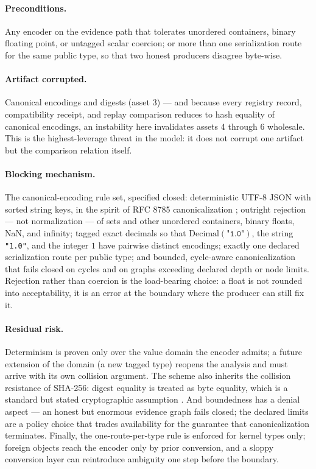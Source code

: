 \paragraph{Preconditions.} Any encoder on the evidence path that tolerates unordered containers, binary floating point, or untagged scalar coercion; or more than one serialization route for the same public type, so that two honest producers disagree byte-wise.

\paragraph{Artifact corrupted.} Canonical encodings and digests (asset 3) --- and because every registry record, compatibility receipt, and replay comparison reduces to hash equality of canonical encodings, an instability here invalidates assets 4 through 6 wholesale. This is the highest-leverage threat in the model: it does not corrupt one artifact but the comparison relation itself.

\paragraph{Blocking mechanism.} The canonical-encoding rule set, specified closed: deterministic UTF-8 JSON with sorted string keys, in the spirit of RFC 8785 canonicalization \cite{jcs}; outright rejection --- not normalization --- of sets and other unordered containers, binary floats, NaN, and infinity; tagged exact decimals so that $\mathrm{Decimal}(\texttt{"1.0"})$, the string \texttt{"1.0"}, and the integer $1$ have pairwise distinct encodings; exactly one declared serialization route per public type; and bounded, cycle-aware canonicalization that fails closed on cycles and on graphs exceeding declared depth or node limits. Rejection rather than coercion is the load-bearing choice: a float is not rounded into acceptability, it is an error at the boundary where the producer can still fix it.

\paragraph{Residual risk.} Determinism is proven only over the value domain the encoder admits; a future extension of the domain (a new tagged type) reopens the analysis and must arrive with its own collision argument. The scheme also inherits the collision resistance of SHA-256: digest equality is treated as byte equality, which is a standard but stated cryptographic assumption \cite{anderson}. And boundedness has a denial aspect --- an honest but enormous evidence graph fails closed; the declared limits are a policy choice that trades availability for the guarantee that canonicalization terminates. Finally, the one-route-per-type rule is enforced for kernel types only; foreign objects reach the encoder only by prior conversion, and a sloppy conversion layer can reintroduce ambiguity one step before the boundary.

